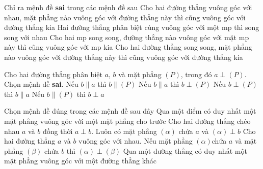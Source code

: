 	\begin{ex}%
		Chỉ ra mệnh đề \textbf{sai} trong các mệnh đề sau
		\choice 
		{\True  Cho hai đường thẳng vuông góc với nhau, mặt phẳng nào vuông góc với đường thẳng này thì cũng vuông góc với đường thẳng kia} 
		{ Hai đường thẳng phân biệt cùng vuông góc với một mp thì song song với nhau} 
		{ Cho hai mp song song, đường thẳng nào vuông góc với mặt mp này thì cũng vuông góc với mp kia} 
		{ Cho hai đường thẳng song song, mặt phẳng nào vuông góc với đường thẳng này thì cũng vuông góc với đường thẳng kia}
	\end{ex}
	
	\begin{ex}%
		Cho hai đường thẳng phân biệt $a$, $b$ và mặt phẳng $( P )$, trong đó $a\perp ( P )$. Chọn mệnh đề \textbf{sai}.
		\choice 
		{ \True Nếu $b\parallel a$ thì $b\parallel ( P )$}
		{ Nếu $b\parallel a$ thì $b\perp ( P )$} 
		{ Nếu $b\perp ( P )$ thì $b\parallel a$}
		{ Nếu $b\parallel ( P )$ thì $b\perp a$}
	\end{ex} 
	\begin{ex}%
		Chọn mệnh đề đúng trong các mệnh đề sau đây
		\choice 
		{ Qua một điểm có duy nhất một mặt phẳng vuông góc với một mặt phẳng cho trước} 
		{ \True Cho hai đường thẳng chéo nhau $a$ và $b$ đồng thời $a\perp b$. Luôn có mặt phẳng $( \alpha )$ chứa $a$ và $( \alpha )\perp b$} 
		{ Cho hai đường thẳng $a$ và $b$ vuông góc với nhau. Nếu mặt phẳng $( \alpha )$chứa $a$ và mặt phẳng $( \beta )$ chứa $b$ thì $( \alpha )\perp ( \beta )$} 
		{ Qua một đường thẳng có duy nhất một mặt phẳng vuông góc với một đường thẳng khác	}
	\end{ex} 
	
